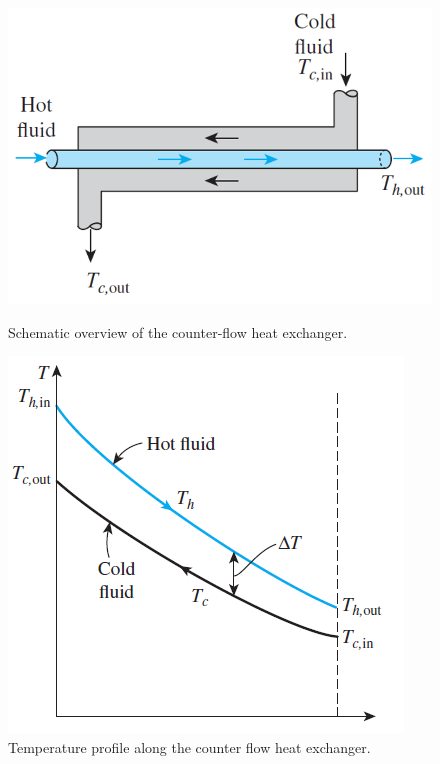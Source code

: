 \begin{figure}[htbp]
  \centering
  \begin{minipage}[b]{0.4\textwidth}
    \centering
    \includegraphics[width=\textwidth]{Literature Survey - DCSC template/figuresLIT/countercurrent.png}
    \caption{Schematic overview of the counter-flow heat exchanger.}
    \label{fig::counterhex}
  \end{minipage}
  \begin{minipage}[b]{0.4\textwidth}
    \centering
    \includegraphics[width=\textwidth]{Literature Survey - DCSC template/figuresLIT/heatexchangerTemperatureprofile.png}
    \caption{Temperature profile along the counter flow heat exchanger.}
    \label{fig::counterflowHEX}
  \end{minipage}
\end{figure}

